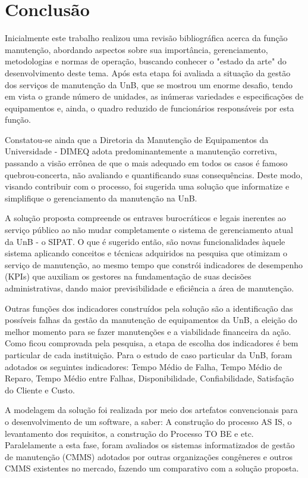 \chapter{Conclusão}

Inicialmente este trabalho realizou uma revisão bibliográfica acerca da função manutenção, abordando aspectos sobre sua importância, gerenciamento, metodologias e normas de operação, buscando conhecer o "estado da arte" do desenvolvimento deste tema. Após esta etapa foi avaliada a situação da gestão dos serviços de manutenção da UnB, que se mostrou um enorme desafio, tendo em vista o grande número de unidades, as inúmeras variedades e especificações de equipamentos e, ainda, o quadro reduzido de funcionários responsáveis por esta função.

Constatou-se ainda que a Diretoria da Manutenção de Equipamentos da Universidade - DIMEQ adota predominantemente a manutenção corretiva, passando a visão errônea de que o mais adequado em todos os casos é famoso quebrou-concerta, não avaliando e quantificando suas consequências. Deste modo, visando contribuir com o processo, foi sugerida uma solução que informatize e simplifique o gerenciamento da manutenção na UnB.

A solução proposta compreende os entraves burocráticos e legais inerentes ao serviço público ao não mudar completamente o sistema de gerenciamento atual da UnB - o SIPAT. O que é sugerido então, são novas funcionalidades àquele sistema aplicando conceitos e técnicas adquiridos na pesquisa que otimizam o serviço de manutenção, ao mesmo tempo que constrói indicadores de desempenho (KPIs) que auxiliam os gestores na fundamentação de suas decisões administrativas, dando maior previsibilidade e eficiência a área de manutenção.

Outras funções dos indicadores construídos pela solução são a identificação das possíveis falhas da gestão da manutenção de equipamentos da UnB, a eleição do melhor momento para se fazer manutenções e a viabilidade financeira da ação. Como ficou comprovada pela pesquisa, a etapa de escolha dos indicadores é bem particular de cada instituição. Para o estudo de caso particular da UnB, foram adotados os seguintes indicadores: Tempo Médio de Falha, Tempo Médio de Reparo, Tempo Médio entre Falhas, Disponibilidade, Confiabilidade, Satisfação do Cliente e Custo.

A modelagem da solução foi realizada por meio dos artefatos convencionais para o desenvolvimento de um software, a saber: A construção do processo AS IS, o levantamento dos requisitos, a construção do Processo TO BE e etc. Paralelamente a esta fase, foram avaliados os sistemas informatizados de gestão de manutenção (CMMS) adotados por outras organizações congêneres e outros CMMS existentes no mercado, fazendo um comparativo com a solução proposta.

